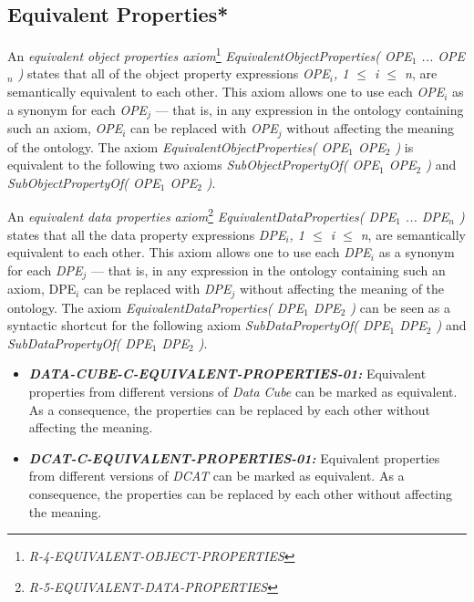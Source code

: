 \documentclass{llncs}
\begin{document}
\subsection{Equivalent Properties*}

An \emph{equivalent object properties axiom}\footnote{\emph{R-4-EQUIVALENT-OBJECT-PROPERTIES}} \emph{EquivalentObjectProperties( OPE$_1$ ... OPE$_n$ )} states that all of the object property expressions \emph{OPE$_i$, 1 $\leq$ i $\leq$ n}, are semantically equivalent to each other. This axiom allows one to use each \emph{OPE$_i$} as a synonym for each \emph{OPE$_j$} — that is, in any expression in the ontology containing such an axiom, \emph{OPE$_i$} can be replaced with \emph{OPE$_j$} without affecting the meaning of the ontology. The axiom \emph{EquivalentObjectProperties( OPE$_1$ OPE$_2$ )} is equivalent to the following two axioms \emph{SubObjectPropertyOf( OPE$_1$ OPE$_2$ )} and \emph{SubObjectPropertyOf( OPE$_1$ OPE$_2$ )}.

An \emph{equivalent data properties axiom}\footnote{\emph{R-5-EQUIVALENT-DATA-PROPERTIES}} \emph{EquivalentDataProperties( DPE$_1$ ... DPE$_n$ )} states that all the data property expressions \emph{DPE$_i$, 1 $\leq$ i $\leq$ n}, are semantically equivalent to each other. This axiom allows one to use each \emph{DPE$_i$} as a synonym for each \emph{DPE$_j$} — that is, in any expression in the ontology containing such an axiom, DPE$_i$ can be replaced with \emph{DPE$_j$} without affecting the meaning of the ontology. The axiom \emph{EquivalentDataProperties( DPE$_1$ DPE$_2$ )} can be seen as a syntactic shortcut for the following axiom \emph{SubDataPropertyOf( DPE$_1$ DPE$_2$ )} and \emph{SubDataPropertyOf( DPE$_1$ DPE$_2$ )}.

\begin{itemize}
	\item \textbf{{\em DATA-CUBE-C-EQUIVALENT-PROPERTIES-01:}}
	Equivalent properties from different versions of \emph{Data Cube} can be marked as equivalent. 
	As a consequence, the properties can be replaced by each other without affecting the meaning.
\end{itemize}

\begin{itemize}
	\item \textbf{{\em DCAT-C-EQUIVALENT-PROPERTIES-01:}}
	Equivalent properties from different versions of \emph{DCAT} can be marked as equivalent. 
	As a consequence, the properties can be replaced by each other without affecting the meaning.
\end{itemize}
\end{document}
